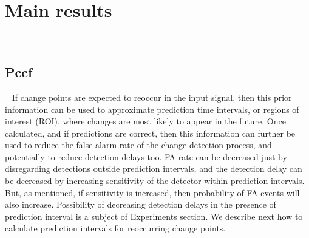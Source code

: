 \documentclass[doctoral,utf8,lot,loar,lof,shortloft,index]{jydiss}
\begin{document}
\chapter{Main results}
~\cite{MaslovSDM2016, MaslovIJCNN2017}

\section{Pccf}~\label{sec:pccf}
If change points are expected to reoccur in the input signal, then this prior information can be used to approximate prediction time intervals, or regions of interest (ROI), where changes are most likely to appear in the future.
Once calculated, and if predictions are correct, then this information can further be used to reduce the false alarm rate of the change detection process, %
and potentially to reduce detection delays too.
FA rate can be decreased just by disregarding detections outside prediction intervals, and the detection delay can be decreased by increasing sensitivity of the detector within prediction intervals.
But, as mentioned, if sensitivity is increased, then probability of FA events will also  increase.
Possibility of decreasing detection delays in the presence of prediction interval is a subject of Experiments section.
We describe next how to calculate prediction intervals for reoccurring change points.
\end{document}
